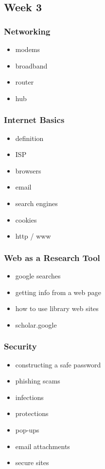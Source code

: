 \documentclass[11pt]{article}
\begin{document}
\subsection*{Week 3}

\subsubsection*{Networking}

\begin{itemize}\itemsep.5pt
\item modems
\item broadband
\item router
\item hub
\end{itemize}

\subsubsection*{Internet Basics}

\begin{itemize}\itemsep.5pt
\item definition
\item ISP
\item browsers
\item email
\item search engines
\item cookies
\item http / www
\end{itemize}

\subsubsection*{Web as a Research Tool}

\begin{itemize}\itemsep.5pt
\item google searches
\item getting info from a web page
\item how to use library web sites
\item scholar.google
\end{itemize}

\subsubsection*{Security}

\begin{itemize}\itemsep.5pt
\item constructing a safe password
\item phishing scams
\item infections
\item protections
\item pop-ups
\item email attachments
\item secure sites
\end{itemize}
\end{document}
